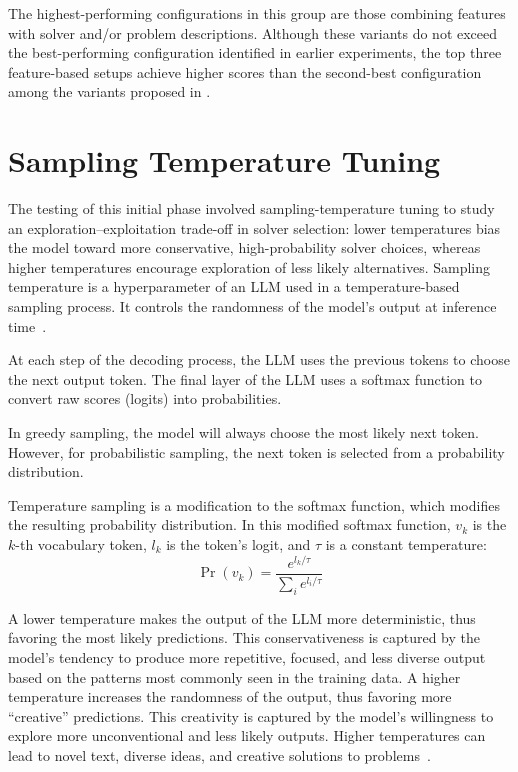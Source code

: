 \documentclass[../../main]{subfiles}
\begin{document}
The highest-performing configurations in this group are those combining features with solver and/or problem descriptions. Although these variants do not exceed the best-performing configuration identified in earlier experiments, the top three feature-based setups achieve higher scores than the second-best configuration among the variants proposed in .

\section{Sampling Temperature Tuning}
\label{sec:sampTemp}
The testing of this initial phase involved sampling-temperature tuning to study an exploration--exploitation trade-off in solver selection: lower temperatures bias the model toward more conservative, high-probability solver choices, whereas higher temperatures encourage exploration of less likely alternatives. Sampling temperature is a hyperparameter of an LLM used in a temperature-based sampling process. It controls the randomness of the model's output at inference time~\cite{TempDef}.

At each step of the decoding process, the LLM uses the previous tokens to choose the next output token. The final layer of the LLM uses a softmax function to convert raw scores (logits) into probabilities.

In greedy sampling, the model will always choose the most likely next token. However, for probabilistic sampling, the next token is selected
from a probability distribution.

Temperature sampling is a modification to the softmax function, which modifies the resulting probability distribution. In this modified softmax function, $v_k$ is the $k$-th vocabulary token, $l_k$ is the token's logit, and $\tau$ is a constant temperature:
\[
\Pr(v_k) = \frac{e^{l_k / \tau}}{\sum_i e^{l_i / \tau}}
\]

A lower temperature makes the output of the LLM more deterministic, thus favoring the most likely predictions. This conservativeness is captured by the model's tendency to produce more repetitive, focused, and less diverse output based on the patterns most commonly seen in the training data. 
A higher temperature increases the randomness of the output, thus favoring more ``creative'' predictions. This creativity is captured by the model's willingness to explore more unconventional and less likely outputs. Higher temperatures can lead to novel text, diverse ideas, and creative solutions to problems~\cite{NNetKnowledge, ContextualTemp}.
\end{document}
